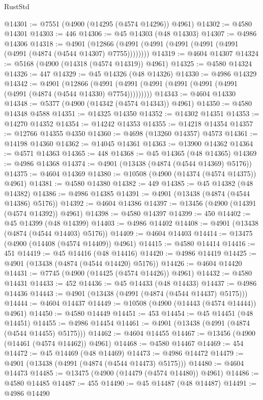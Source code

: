 \begin{lexlean}{RustStd}
\begin{coremodule}
@14301 := @7551 (@4900 (@14295 (@4574 @14296)) @4961)
@14302 := @4580 @14301
@14303 := 446
@14306 := @45 @14303 (@48 @14303)
@14307 := @4986 @14306
@14318 := @4901
    (@12866 (@4991 (@4991 (@4991 (@4991 (@4991 (@4991 (@4874 (@4544 @14307) @7755))))))))
@14319 := @4604 @14307
@14324 := @5168 (@4900 (@14318 (@4574 @14319)) @4961)
@14325 := @4580 @14324
@14326 := 447
@14329 := @45 @14326 (@48 @14326)
@14330 := @4986 @14329
@14342 := @4901
    (@12866 (@4991 (@4991 (@4991 (@4991 (@4991 (@4991 (@4991 (@4874 (@4544 @14330) @7754)))))))))
@14343 := @4604 @14330
@14348 := @5377 (@4900 (@14342 (@4574 @14343)) @4961)
@14350 := @4580 @14348 @4588
@14351 := @14325 @14350
@14352 := @14302 @14351
@14353 := @14270 @14352
@14354 := @14242 @14353
@14355 := @14218 @14354
@14357 := @12766 @14355 @4350
@14360 := @4698 (@13260 @14357) @4573
@14361 := @14198 @14360
@14362 := @14045 @14361
@14363 := @13900 @14362
@14364 := @4571 @14363
@14365 := 448
@14368 := @45 @14365 (@48 @14365)
@14369 := @4986 @14368
@14374 := @4901 (@13438 (@4874 (@4544 @14369) @5176))
@14375 := @4604 @14369
@14380 := @10508 (@4900 (@14374 (@4574 @14375)) @4961)
@14381 := @4580 @14380
@14382 := 449
@14385 := @45 @14382 (@48 @14382)
@14386 := @4986 @14385
@14391 := @4901 (@13438 (@4874 (@4544 @14386) @5176))
@14392 := @4604 @14386
@14397 := @13456 (@4900 (@14391 (@4574 @14392)) @4961)
@14398 := @4580 @14397
@14399 := 450
@14402 := @45 @14399 (@48 @14399)
@14403 := @4986 @14402
@14408 := @4901 (@13438 (@4874 (@4544 @14403) @5176))
@14409 := @4604 @14403
@14414 := @13475 (@4900 (@14408 (@4574 @14409)) @4961)
@14415 := @4580 @14414
@14416 := 451
@14419 := @45 @14416 (@48 @14416)
@14420 := @4986 @14419
@14425 := @4901 (@13438 (@4874 (@4544 @14420) @5176))
@14426 := @4604 @14420
@14431 := @7745 (@4900 (@14425 (@4574 @14426)) @4961)
@14432 := @4580 @14431
@14433 := 452
@14436 := @45 @14433 (@48 @14433)
@14437 := @4986 @14436
@14443 := @4901 (@13438 (@4991 (@4874 (@4544 @14437) @5175)))
@14444 := @4604 @14437
@14449 := @10508 (@4900 (@14443 (@4574 @14444)) @4961)
@14450 := @4580 @14449
@14451 := 453
@14454 := @45 @14451 (@48 @14451)
@14455 := @4986 @14454
@14461 := @4901 (@13438 (@4991 (@4874 (@4544 @14455) @5175)))
@14462 := @4604 @14455
@14467 := @13456 (@4900 (@14461 (@4574 @14462)) @4961)
@14468 := @4580 @14467
@14469 := 454
@14472 := @45 @14469 (@48 @14469)
@14473 := @4986 @14472
@14479 := @4901 (@13438 (@4991 (@4874 (@4544 @14473) @5175)))
@14480 := @4604 @14473
@14485 := @13475 (@4900 (@14479 (@4574 @14480)) @4961)
@14486 := @4580 @14485
@14487 := 455
@14490 := @45 @14487 (@48 @14487)
@14491 := @4986 @14490

\end{coremodule}
\end{lexlean}
